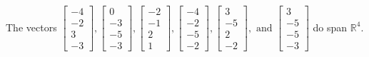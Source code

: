 \begin{exercise}
\begin{exerciseStatement}
  \end{exerciseStatement}
  \begin{exerciseAnswer}
   The vectors \(\left[\begin{array}{r}
-4 \\
-2 \\
3 \\
-3
\end{array}\right] , \left[\begin{array}{r}
0 \\
-3 \\
-5 \\
-3
\end{array}\right] , \left[\begin{array}{r}
-2 \\
-1 \\
2 \\
1
\end{array}\right] , \left[\begin{array}{r}
-4 \\
-2 \\
-5 \\
-2
\end{array}\right] , \left[\begin{array}{r}
3 \\
-5 \\
2 \\
-2
\end{array}\right] , \text{ and } \left[\begin{array}{r}
3 \\
-5 \\
-5 \\
-3
\end{array}\right]\) 
  	 do  
	span \(\mathbb{R}^4\).
  


  \end{exerciseAnswer}
\end{exercise}